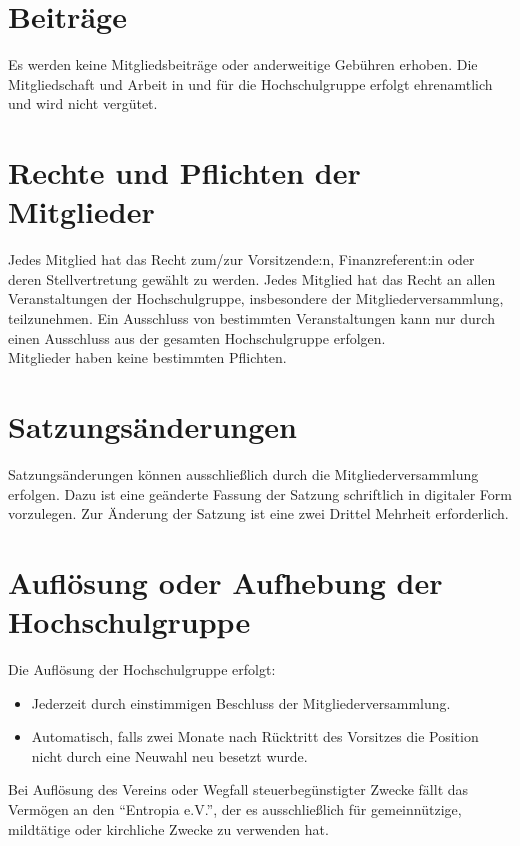 \documentclass[11pt]{article}
\begin{document}
\section{Beiträge}
Es werden keine Mitgliedsbeiträge oder anderweitige Gebühren erhoben. Die Mitgliedschaft und Arbeit in und für die Hochschulgruppe erfolgt ehrenamtlich und wird nicht vergütet.
\section{Rechte und Pflichten der Mitglieder}
Jedes Mitglied hat das Recht zum/zur Vorsitzende:n, Finanzreferent:in oder deren Stellvertretung gewählt zu werden. Jedes Mitglied hat das Recht an allen Veranstaltungen der Hochschulgruppe, insbesondere der Mitgliederversammlung, teilzunehmen. Ein Ausschluss von bestimmten Veranstaltungen kann nur durch einen Ausschluss aus der gesamten Hochschulgruppe erfolgen.\\
Mitglieder haben keine bestimmten Pflichten.
\section{Satzungsänderungen}
Satzungsänderungen können ausschließlich durch die Mitgliederversammlung erfolgen. Dazu ist eine geänderte Fassung der Satzung schriftlich in digitaler Form vorzulegen. Zur Änderung der Satzung ist eine zwei Drittel Mehrheit erforderlich.
\section{Auflösung oder Aufhebung der Hochschulgruppe}
Die Auflösung der Hochschulgruppe erfolgt:
\begin{itemize}
	\item Jederzeit durch einstimmigen Beschluss der Mitgliederversammlung.
	\item Automatisch, falls zwei Monate nach Rücktritt des Vorsitzes die Position nicht durch eine Neuwahl neu besetzt wurde.
\end{itemize}
Bei Auflösung des Vereins oder Wegfall steuerbegünstigter Zwecke fällt das Vermögen an den ``Entropia e.V.'', der es ausschließlich für gemeinnützige,
mildtätige oder kirchliche Zwecke zu verwenden hat.
\end{document}
